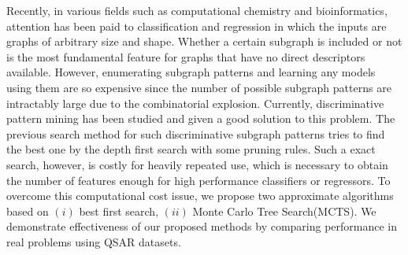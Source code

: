 Recently, in various fields such as computational chemistry and bioinformatics,
attention has been paid to classification and regression
in which the inputs are graphs of arbitrary size and shape.
Whether a certain subgraph is included or not 
is the most fundamental feature for graphs that have no direct descriptors available.
However, enumerating subgraph patterns and learning any models using them are so expensive 
since the number of possible subgraph patterns are intractably large due to the combinatorial explosion.
Currently, discriminative pattern mining has been studied and given a good solution to this problem.
The previous search method for such discriminative subgraph patterns 
tries to find the best one by the depth first search with some pruning rules.
Such a exact search, however, is costly for heavily repeated use, 
which is necessary to obtain the number of features enough for high performance classifiers or regressors.
To overcome this computational cost issue, 
we propose two approximate algorithms based on 
$(i)$ best first search, $(ii)$ Monte Carlo Tree Search(MCTS). 
We demonstrate effectiveness of our proposed methods by comparing performance 
in real problems using QSAR datasets.
